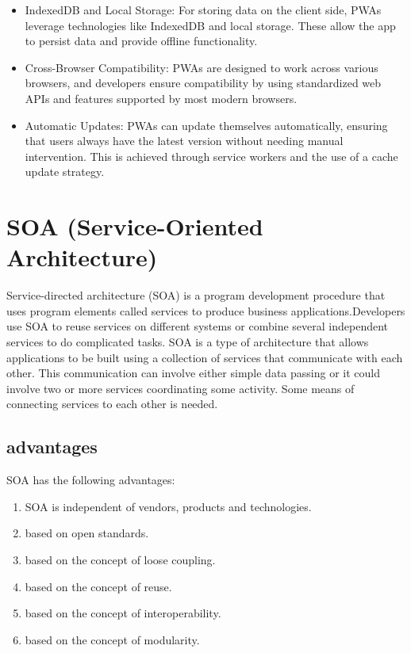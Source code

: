 \documentclass[12pt,a4paper, twosite]{article}
\begin{document}
\begin{itemize}
\item IndexedDB and Local Storage:
  For storing data on the client side, PWAs leverage technologies like IndexedDB and local storage. These allow the app to persist data and provide offline functionality.

\item Cross-Browser Compatibility:
  PWAs are designed to work across various browsers, and developers ensure compatibility by using standardized web APIs and features supported by most modern browsers.

\item Automatic Updates:
  PWAs can update themselves automatically, ensuring that users always have the latest version without needing manual intervention. This is achieved through service workers and the use of a cache update strategy.
\end{itemize}


\section{SOA (Service-Oriented Architecture)}
\label{sec:org40573d1}

Service-directed architecture (SOA) is a program development procedure that uses program elements called services to produce business applications.Developers use SOA to reuse services on different systems or combine several independent services to do complicated tasks. SOA is a type of architecture that allows applications to be built using a collection of services that communicate with each other. This communication can involve either simple data passing or it could involve two or more services coordinating some activity. Some means of connecting services to each other is needed.

\subsection{advantages}
\label{sec:orgb8b6b9e}
SOA has the following advantages:
\begin{enumerate}
\item SOA is independent of vendors, products and technologies.
\item based on open standards.
\item based on the concept of loose coupling.
\item based on the concept of reuse.
\item based on the concept of interoperability.
\item based on the concept of modularity.
\end{enumerate}
\end{document}
